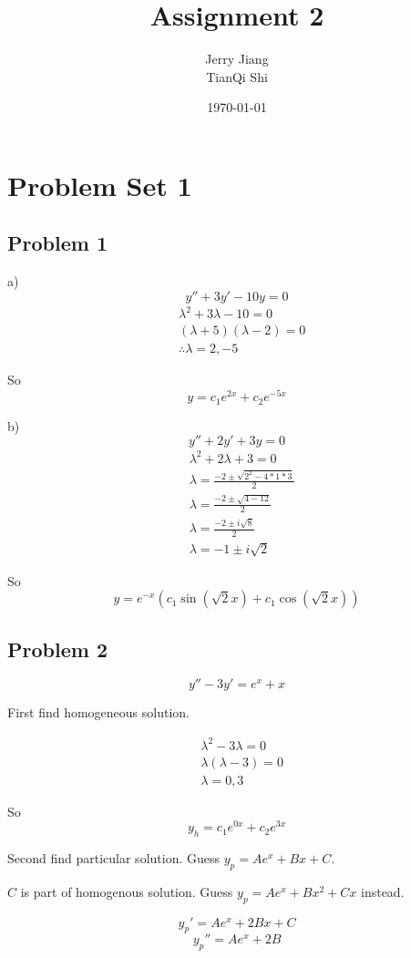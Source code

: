 \documentclass[titlepage]{article}
\title{Assignment 2}
\date{\today}
\author{Jerry Jiang\\ TianQi Shi}
\begin{document}
\maketitle

\noindent
\section{Problem Set 1}
\subsection{Problem 1}
a) $$y'' + 3y' - 10y = 0$$
\begin{align*}
    &\lambda ^2 + 3 \lambda - 10 = 0
 \\ &(\lambda + 5)(\lambda -  2) = 0
 \\ &\therefore \lambda = 2, -5
\end{align*}

So $$y = c_1 e^{2x} + c_2 e^{-5x}$$

b) $$y'' + 2y' + 3y = 0$$
\begin{align*}
    &\lambda ^2 + 2 \lambda + 3 = 0
 \\ &\lambda = \frac{-2 \pm \sqrt{2^2 - 4 * 1 * 3}}{2}
 \\ &\lambda = \frac{-2 \pm \sqrt{4 - 12}}{2}
 \\ &\lambda = \frac{-2 \pm i\sqrt{8}}{2}
 \\ &\lambda = -1 \pm i\sqrt{2}
\end{align*}

So $$y = e^{-x}(c_1 \sin(\sqrt{2}x) + c_1 \cos(\sqrt{2}x))$$
\subsection{Problem 2}
$$y'' - 3y' = e^x + x$$

First find homogeneous solution.

\begin{align*}
    &\lambda^2 - 3\lambda = 0
 \\ &\lambda (\lambda - 3) = 0
 \\ &\lambda = 0, 3
\end{align*}

So $$y_h = c_1e^{0x} + c_2e^{3x}$$

Second find particular solution. Guess $y_p = Ae^x + Bx + C$.

$C$ is part of homogenous solution. Guess $y_p = Ae^x + Bx^2 + Cx$ instead.

$$y_p' = Ae^x + 2Bx + C$$
$$y_p'' = Ae^x + 2B$$
\end{document}
